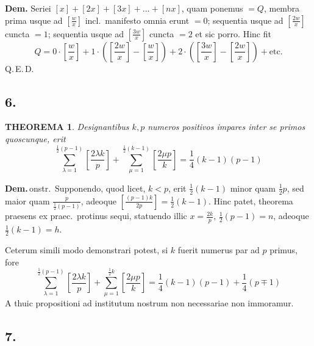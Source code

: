 \documentclass[12pt,a4paper]{article}
\theoremstyle{plain}
\newtheorem{theorem}{THEOREMA}[section]
\begin{document}
\noindent\textbf{Dem.} Seriei $[x] + [2x] + [3x] + \ldots + [nx]$, quam ponemus $= Q$, membra prima usque ad $[\frac{w}{x}]$ incl.\ manifesto omnia erunt $= 0$; sequentia usque ad $[\frac{2w}{x}]$ cuncta $= 1$; sequentia usque ad $[\frac{3w}{x}]$ cuncta $= 2$ et sic porro. Hinc fit
\[
Q = 0 \cdot \left[\frac{w}{x}\right] + 1 \cdot \left(\left[\frac{2w}{x}\right] - \left[\frac{w}{x}\right]\right) + 2 \cdot \left(\left[\frac{3w}{x}\right] - \left[\frac{2w}{x}\right]\right) + \text{etc.}
\]
Q.\,E.\,D.

\subsection*{6.}

\begin{theorem}
Designantibus $k, p$ numeros positivos impares inter se primos quoscunque, erit
\[
\sum_{\lambda=1}^{\frac{1}{2}(p-1)} \left[\frac{2\lambda k}{p}\right] + \sum_{\mu=1}^{\frac{1}{2}(k-1)} \left[\frac{2\mu p}{k}\right] = \frac{1}{4}(k-1)(p-1)
\]
\end{theorem}

\noindent\textbf{Dem.}\,onstr.\ Supponendo, quod licet, $k < p$, erit $\frac{1}{2}(k-1)$ minor quam $\frac{1}{2}p$, sed maior quam $\frac{p}{\frac{1}{2}(p-1)}$, adeoque $[\frac{(p-1)k}{2p}] = \frac{1}{2}(k-1)$. Hinc patet, theorema praesens ex praec.\ protinus sequi, statuendo illic $x = \frac{2k}{p}$, $\frac{1}{2}(p-1) = n$, adeoque $\frac{1}{2}(k-1) = h$.

\medskip
Ceterum simili modo demonstrari potest, si $k$ fuerit numerus par ad $p$ primus, fore
\[
\sum_{\lambda=1}^{\frac{1}{2}(p-1)} \left[\frac{2\lambda k}{p}\right] + \sum_{\mu=1}^{\frac{1}{2}k} \left[\frac{2\mu p}{k}\right] = \frac{1}{4}(k-1)(p-1) + \frac{1}{4}(p \mp 1)
\]
A thuic propositioni ad institutum nostrum non necessariae non immoramur.

\subsection*{7.}
\end{document}
